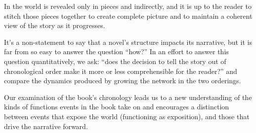 In \infinitejest the world is revealed only in pieces and indirectly, and it is up to the reader to stitch those pieces together to create complete picture and to maintain a coherent view of the story as it progresses. 

It's a non-statement to say that a novel's structure impacts its narrative, but it is far from so easy to answer the question ``how?'' In an effort to answer this question quantitatively, we ask: ``does the decision to tell the story out of chronological order make it more or less comprehensible for the reader?'' and compare the dynamics produced by growing the network in the two orderings.

Our examination of the book's chronology leads us to a new understanding of the kinds of functions events in the book take on and encourages a distinction between events that expose the world (functioning as exposition), and those that drive the narrative forward.
